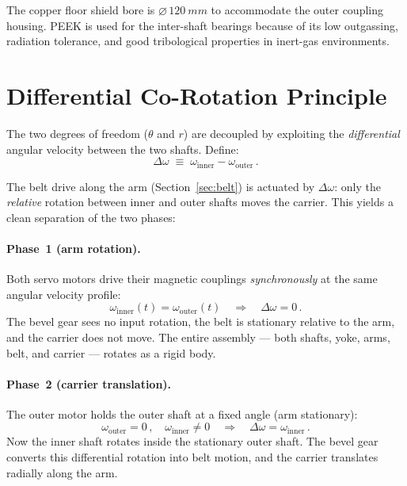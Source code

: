 \documentclass[11pt,a4paper]{article}
\begin{document}
The copper floor shield bore is $\varnothing\,\SI{120}{mm}$ to
accommodate the outer coupling housing. PEEK is used for the
inter-shaft bearings because of its low outgassing, radiation
tolerance, and good tribological properties in inert-gas environments.


\section{Differential Co-Rotation Principle}
\label{sec:differential}

The two degrees of freedom ($\theta$ and $r$) are decoupled by
exploiting the \emph{differential} angular velocity between the two
shafts. Define:
\begin{equation}
  \Delta\omega \;\equiv\; \omega_\mathrm{inner} - \omega_\mathrm{outer}\,.
  \label{eq:domega}
\end{equation}

The belt drive along the arm (Section~\ref{sec:belt}) is actuated by
$\Delta\omega$: only the \emph{relative} rotation between inner and
outer shafts moves the carrier. This yields a clean separation of the
two phases:

\paragraph{Phase~1 (arm rotation).}
Both servo motors drive their magnetic couplings \emph{synchronously}
at the same angular velocity profile:
\begin{equation}
  \omega_\mathrm{inner}(t) = \omega_\mathrm{outer}(t)
  \quad\Longrightarrow\quad
  \Delta\omega = 0\,.
\end{equation}
The bevel gear sees no input rotation, the belt is stationary relative
to the arm, and the carrier does not move. The entire assembly ---
both shafts, yoke, arms, belt, and carrier --- rotates as a rigid body.

\paragraph{Phase~2 (carrier translation).}
The outer motor holds the outer shaft at a fixed angle (arm stationary):
\begin{equation}
  \omega_\mathrm{outer} = 0\,,\quad
  \omega_\mathrm{inner} \ne 0
  \quad\Longrightarrow\quad
  \Delta\omega = \omega_\mathrm{inner}\,.
\end{equation}
Now the inner shaft rotates inside the stationary outer shaft. The
bevel gear converts this differential rotation into belt motion, and the
carrier translates radially along the arm.
\end{document}
